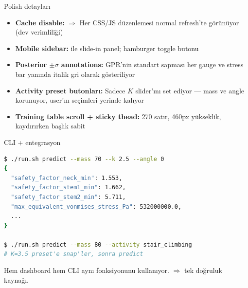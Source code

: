 \begin{frame}{Polish detayları}
  \begin{itemize}
    \item \textbf{Cache disable:} 
          \(\Rightarrow\) Her CSS/JS düzenlemesi normal refresh'te görünüyor
          (dev verimliliği)
    \item \textbf{Mobile sidebar:}  ile
          slide-in panel; hamburger toggle butonu
    \item \textbf{Posterior \(\pm\sigma\) annotations:} GPR'nin standart
          sapması her gauge ve stress bar yanında italik gri olarak gösteriliyor
    \item \textbf{Activity preset butonları:} Sadece \(K\) slider'ını set
          ediyor --- mass ve angle korunuyor, user'ın seçimleri yerinde kalıyor
    \item \textbf{Training table scroll + sticky thead:} 270 satır, 460px
          yükseklik, kaydırırken başlık sabit
  \end{itemize}
\end{frame}

\begin{frame}[fragile]{CLI + entegrasyon}
\begin{lstlisting}[language=bash, basicstyle=\ttfamily\small]
$ ./run.sh predict --mass 70 --k 2.5 --angle 0
{
  "safety_factor_neck_min": 1.553,
  "safety_factor_stem1_min": 1.662,
  "safety_factor_stem2_min": 5.711,
  "max_equivalent_vonmises_stress_Pa": 532000000.0,
  ...
}

$ ./run.sh predict --mass 80 --activity stair_climbing
# K=3.5 preset'e snap'ler, sonra predict
\end{lstlisting}

  \vspace{0.4cm}
  Hem dashboard hem CLI \alert{aynı}  fonksiyonunu kullanıyor.
   \(\Rightarrow\) tek doğruluk kaynağı.
\end{frame}

